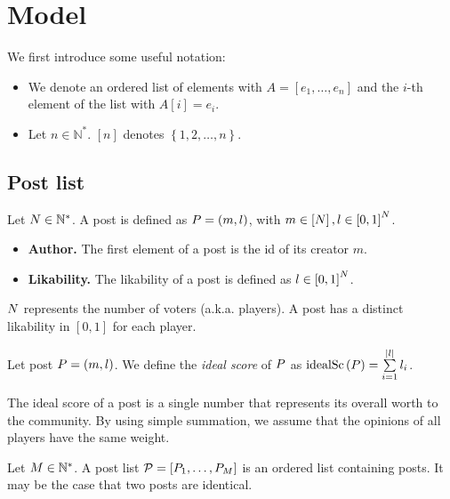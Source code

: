 \documentclass[a4paper,english,cleveref, autoref]{oasics-v2019}
\begin{document}
\section{Model}
We first introduce some useful notation:
\begin{itemize}
  \item We denote an ordered list of elements with $A = \left[e_1, \dots,
  e_n\right]$ and the $i$-th element of the list with $A\left[i\right] = e_i$.
  \item Let $n \in \mathbb{N}^*$. $\left[n\right]$ denotes $\left\{1, 2, \dots,
  n\right\}$.
\end{itemize}

  \subsection{Post list}
\begin{definition}[Post]
  Let $N \in \mathbb{N}^*$. A post is defined as $P = \left(m,
  l\right)$, with $m \in \left[N\right], l \in \left[0,
  1\right]^N$.
  \begin{itemize}
    \item \textbf{Author.} The first element of a post is the id of its creator
    $m$.

    \item \textbf{Likability.} The likability of a post is defined as $l \in
    \left[0, 1\right]^N$.
  \end{itemize}
\end{definition}

    \noindent $N$ represents the number of voters (a.k.a. players). A
    post has a distinct likability in $\left[0, 1\right]$ for each player.

\begin{definition}
  Let post $P = \left(m, l\right)$. We define the \emph{ideal score} of
  $P$ as $\mathrm{idealSc}\left(P\right) = \sum\limits_{i = 1}^{|l|} l_i$.
\end{definition}

    \noindent The ideal score of a post is a single number that represents its
    overall worth to the community. By using simple summation, we assume that
    the opinions of all players have the same weight.

\begin{definition}
  Let $M \in \mathbb{N}^*$. A post list $\mathcal{P} = \left[P_1,
  \dots, P_M\right]$ is an ordered list containing posts. It may be
  the case that two posts are identical.
\end{definition}
\end{document}
